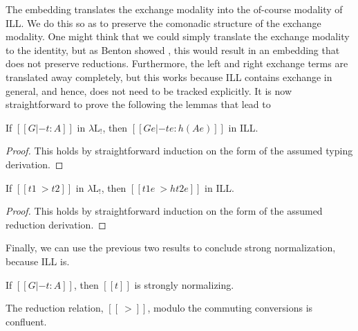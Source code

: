\documentclass{llncs}
\begin{document}
The embedding  translates the exchange modality into the
of-course modality of ILL.  We do this so as to preserve the comonadic
structure of the exchange modality.  One might think that we could
simply translate the exchange modality to the identity, but as Benton
showed \cite{Benton:1995c}, this would result in an embedding that
does not preserve reductions.  Furthermore, the left and right
exchange terms are translated away completely, but this works because
ILL contains exchange in general, and hence, does not need to be
tracked explicitly.  It is now straightforward to prove the following the lemmas that lead to



\begin{lemma}
  \label{lemma:type_preserving_embedding_lambdaLk}
  If $[[G |- t : A]]$ in $\lambda\text{L}_!$, then
  $[[G e |- t e : h(A e)]]$ in ILL.
\end{lemma}
\begin{proof}
  This holds by straightforward induction on the form of the assumed
  typing derivation.
\end{proof}
\begin{lemma}
  \label{lemma:reduction_preserving_embedding_lambdaLk}
  If $[[t1 ~> t2]]$ in $\lambda\text{L}_!$, then $[[t1 e ~> h{t2 e}]]$
  in ILL.
\end{lemma}
\begin{proof}
  This holds by straightforward induction on the form of the assumed
  reduction derivation.
\end{proof}
\noindent
Finally, we can use the previous two results to conclude strong
normalization, because ILL is.


\begin{theorem}
  \label{corollary:strong_normalization_lambdaLk}
  If $[[G |- t : A]]$, then $[[t]]$ is strongly normalizing.
\end{theorem}



\begin{theorem}[Confluence]
  \label{thm:confluence-lambdaLk}
  The reduction relation, $[[~>]]$, modulo the commuting conversions
  is confluent.
\end{theorem}
\end{document}
